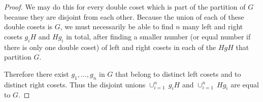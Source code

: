 \documentclass[11pt]{article}
\begin{document}
\begin{enumerate}
\begin{enumerate}[label=\textbf{(\alph*)}]
\begin{proof}
            We may do this for every double coset which is part of the partition of $G$ because they are disjoint from each other. Because the union of each of these double cosets is $G$, we must necessarily be able to find $n$ many left and right cosets $g_iH$ and $Hg_i$ in total, after finding a smaller number (or equal number if there is only one double coset) of left and right cosets in each of the $HgH$ that partition $G$.

            Therefore there exist $g_1,\dots, g_n$ in $G$ that belong to distinct left cosets and to distinct right cosets. Thus the disjoint unions $\cup_{i= 1}^n~ g_iH$ and $\cup_{i= 1}^n~ Hg_i$ are equal to $G$.
        \end{proof}
    \end{enumerate}
\end{enumerate}
\end{document}
